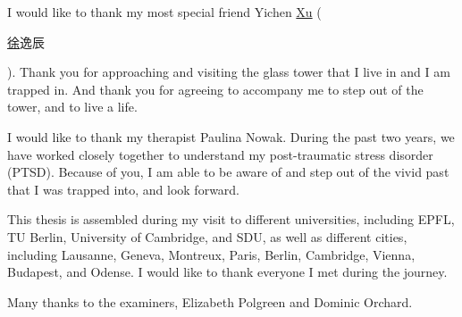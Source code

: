 \documentclass[phd,icsa,twoside,logo]{infthesis}
\begin{document}
\begin{preliminary}
\begin{acknowledgements}
I would like to thank my most special friend Yichen \underline{Xu} (\begin{CJK*}{UTF8}{gbsn}\underline{徐}逸辰\end{CJK*}). Thank you for approaching and visiting the glass tower that I live in and I am trapped in. And thank you for agreeing to accompany me to step out of the tower, and to live a life.

I would like to thank my therapist Paulina Nowak. During the past two years, we have worked closely together to understand my post-traumatic stress disorder (PTSD). Because of you, I am able to be aware of and step out of the vivid past that I was trapped into, and look forward.

This thesis is assembled during my visit to different universities, including EPFL, TU Berlin, University of Cambridge, and SDU, as well as different cities, including Lausanne, Geneva, Montreux, Paris, Berlin, Cambridge, Vienna, Budapest, and Odense. I would like to thank everyone I met during the journey.

Many thanks to the examiners, Elizabeth Polgreen and Dominic Orchard.


\end{acknowledgements}

\extendedstandarddeclaration


\tableofcontents


\end{preliminary}







% 

\appendix







\end{document}
